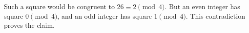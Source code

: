 Such a square would be congruent to $26\equiv2\pmod4$. But an even integer has square $0\pmod4$, and an odd integer has square $1\pmod4$. This contradiction proves the claim.
